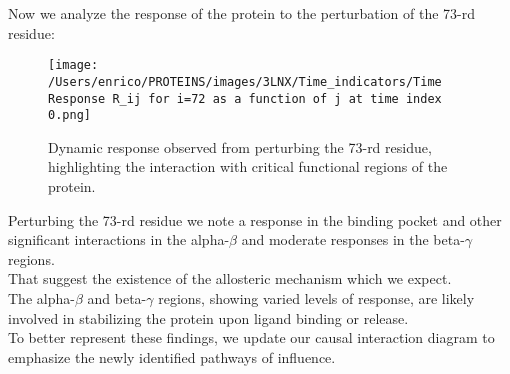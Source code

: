 \documentclass[English, Lau, oneside]{sapthesis}
\begin{document}
Now we analyze the response of the protein to the perturbation of the 73-rd residue:
\begin{figure}[h!]
    \centering
    \texttt{[image: /Users/enrico/PROTEINS/images/3LNX/Time\_indicators/Time Response R\_ij for i=72 as a function of j at time index 0.png]}
    \caption{Dynamic response observed from perturbing the 73-rd residue, highlighting the interaction with critical functional regions of the protein.}
    \label{fig:resp73}
\end{figure}
Perturbing the 73-rd residue we note a response in the binding pocket and other significant interactions in the alpha-$\beta$ and moderate responses in the beta-$\gamma$ regions.\\
That suggest the existence of the allosteric mechanism which we expect.\\
The alpha-$\beta$ and beta-$\gamma$ regions, showing varied levels of response, are likely involved in stabilizing the protein upon ligand binding or release.\\ 
To better represent these findings, we update our causal interaction diagram to emphasize the newly identified pathways of influence.\\
\end{document}
